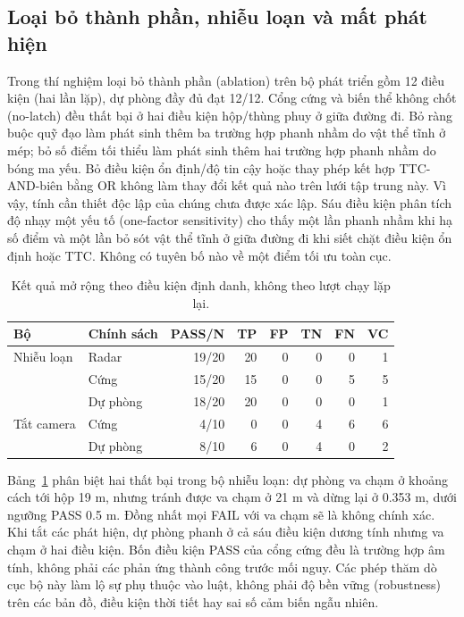 \documentclass[conference]{IEEEtran}
\begin{document}
\subsection{Loại bỏ thành phần, nhiễu loạn và mất phát hiện}
Trong thí nghiệm loại bỏ thành phần (ablation) trên bộ phát triển gồm 12 điều kiện (hai
lần lặp), dự phòng đầy đủ đạt 12/12. Cổng cứng và biến thể không chốt
(no-latch) đều thất bại ở hai điều kiện hộp/thùng phuy ở giữa đường đi. Bỏ
ràng buộc quỹ đạo làm phát sinh thêm ba trường hợp phanh nhầm do vật thể tĩnh
ở mép; bỏ số điểm tối thiểu làm phát sinh thêm hai trường hợp phanh nhầm do
bóng ma yếu. Bỏ điều kiện ổn định/độ tin cậy hoặc thay phép kết hợp
TTC-AND-biên bằng OR không làm thay đổi kết quả nào trên lưới tập trung này. Vì
vậy, tính cần thiết độc lập của chúng chưa được xác lập. Sáu điều kiện phân
tích độ nhạy một yếu tố (one-factor sensitivity) cho thấy một lần phanh nhầm
khi hạ số điểm và một lần bỏ sót vật thể tĩnh ở giữa đường đi khi siết chặt
điều kiện ổn định hoặc TTC. Không có tuyên bố nào về một điểm tối ưu toàn cục.

\begin{table}[t]
\caption{Kết quả mở rộng theo điều kiện định danh, không theo lượt chạy lặp
lại.}
\label{tab:extended}
\centering\scriptsize
\setlength{\tabcolsep}{3pt}
\begin{tabular}{llrrrrrr}
\toprule Bộ & Chính sách & PASS/N & TP & FP & TN & FN & VC\\ \midrule
Nhiễu loạn & Radar & 19/20 & 20 & 0 & 0 & 0 & 1\\
 & Cứng & 15/20 & 15 & 0 & 0 & 5 & 5\\
 & Dự phòng & 18/20 & 20 & 0 & 0 & 0 & 1\\
\midrule
Tắt camera & Cứng & 4/10 & 0 & 0 & 4 & 6 & 6\\
 & Dự phòng & 8/10 & 6 & 0 & 4 & 0 & 2\\
\bottomrule
\end{tabular}
\end{table}

Bảng~\ref{tab:extended} phân biệt hai thất bại trong bộ nhiễu loạn: dự phòng
va chạm ở khoảng cách tới hộp 19 m, nhưng tránh được va chạm ở 21 m và dừng
lại ở 0.353 m, dưới ngưỡng PASS 0.5 m. Đồng nhất mọi FAIL với va chạm sẽ là
không chính xác. Khi tắt các phát hiện, dự phòng phanh ở cả sáu điều kiện
dương tính nhưng va chạm ở hai điều kiện. Bốn điều kiện PASS của cổng cứng đều
là trường hợp âm tính, không phải các phản ứng thành công trước mối nguy. Các
phép thăm dò cục bộ này làm lộ sự phụ thuộc vào luật, không phải độ bền vững
(robustness) trên các bản đồ, điều kiện thời tiết hay sai số cảm biến ngẫu
nhiên.
\end{document}
